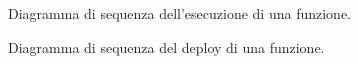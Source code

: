 \begin{figure}[H]
	\noindent
	\caption{Diagramma di sequenza dell'esecuzione di una funzione.}
\end{figure}
\begin{figure}[H]
	\noindent
	\caption{Diagramma di sequenza del deploy di una funzione.}
\end{figure}
